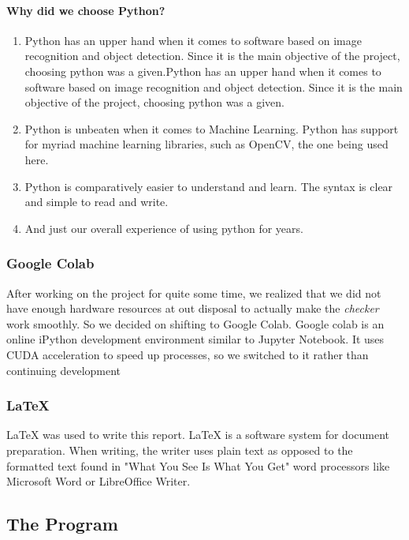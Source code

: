 \documentclass[a4paper]{article}
\begin{document}
\paragraph{Why did we choose Python?}
\begin{enumerate}
    \item Python has an upper hand when it comes to software based on
          image recognition and object detection. Since it is the main
          objective of the project, choosing python was a given.Python has an upper hand when it comes to software based on
          image recognition and object detection. Since it is the main
          objective of the project, choosing python was a given.
    \item Python is unbeaten when it comes to Machine Learning. Python has
          support for myriad machine learning libraries, such as OpenCV, the
          one being used here.
    \item Python is comparatively easier to understand and learn. The syntax
          is clear and simple to read and write.
    \item And just our overall experience of using python for years.
\end{enumerate}

\subsubsection{Google Colab}
After working on the project for quite some time, we realized that we did
not have enough hardware resources at out disposal to actually make the
\textit{checker} work smoothly. So we decided on shifting to Google Colab.
Google colab is an online iPython development environment similar to
Jupyter Notebook. It uses CUDA acceleration to speed up processes, so we
switched to it rather than continuing development

\subsubsection{LaTeX}
LaTeX was used to write this report. LaTeX is a software system for document
preparation. When writing, the writer uses plain text as opposed to the formatted
text found in "What You See Is What You Get" word processors like Microsoft Word
or LibreOffice Writer.

\subsection{The Program}
\end{document}
